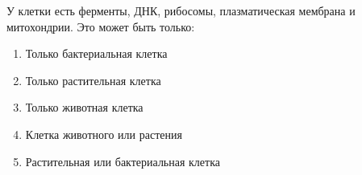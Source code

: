 
У клетки есть
ферменты, ДНК, рибосомы, плазматическая мембрана и митохондрии. Это может быть
только:

\begin{enumerate}
    \item Только бактериальная клетка
    \item Только растительная клетка
    \item Только животная клетка
    \item Клетка животного или растения
    \item Растительная или бактериальная клетка
\end{enumerate}

\explanationSection

